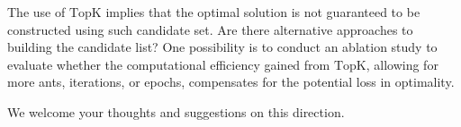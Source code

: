 \documentclass[11pt]{article}
\begin{document}
The use of $\mathrm{TopK}$ implies that the optimal solution is not guaranteed to be constructed using such candidate set. Are there alternative approaches to building the candidate list? One possibility is to conduct an ablation study to evaluate whether the computational efficiency gained from $\mathrm{TopK}$, allowing for more ants, iterations, or epochs, compensates for the potential loss in optimality.

We welcome your thoughts and suggestions on this direction.
\end{document}
